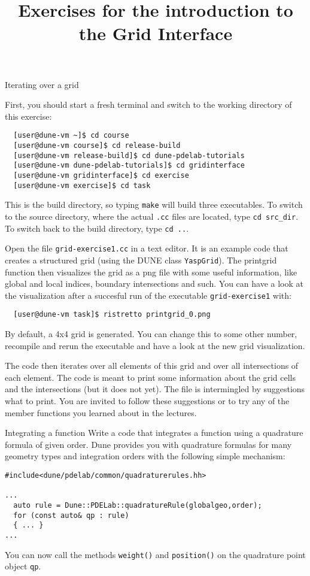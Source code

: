 \documentclass[12pt,a4paper]{article}
\title{\textbf{Exercises for the introduction to the Grid Interface}}
\begin{document}
\exerciseheader

\begin{Exercise}{Iterating over a grid}

First, you should start a fresh terminal and switch to the working directory of this exercise:
\begin{lstlisting}
  [user@dune-vm ~]$ cd course
  [user@dune-vm course]$ cd release-build
  [user@dune-vm release-build]$ cd dune-pdelab-tutorials
  [user@dune-vm dune-pdelab-tutorials]$ cd gridinterface
  [user@dune-vm gridinterface]$ cd exercise
  [user@dune-vm exercise]$ cd task
\end{lstlisting}

This is the build directory, so typing \lstinline!make! will build three executables.
To switch to the source directory, where the actual \lstinline!.cc! files are located, type \lstinline!cd src_dir!.
To switch back to the build directory, type \lstinline!cd ..!.

Open the file \texttt{grid-exercise1.cc} in a text editor.  It is an
example code that creates a structured grid (using the DUNE class
\texttt{YaspGrid}). The printgrid function then visualizes the grid
as a png file with some useful information, like global and local
indices, boundary intersections and such. You can have a look at the
visualization after a succesful run of the executable \lstinline!grid-exercise1!
with:

\begin{lstlisting}
  [user@dune-vm task]$ ristretto printgrid_0.png
\end{lstlisting}

By default, a 4x4 grid is generated. You can change this to some
other number, recompile and rerun the executable and have a look at
the new grid visualization.

The code then iterates over all elements of this grid and
over all intersections of each element.  The code is meant to print
some information about the grid cells and the intersections (but it
does not yet).  The file is intermingled by suggestions what to print.
You are invited to follow these suggestions or to try any of the
member functions you learned about in the lectures.
\end{Exercise}

\begin{Exercise}{Integrating a function}
 Write a code that integrates a function using a quadrature formula of given order.
 Dune provides you with quadrature formulas for many geometry types and integration orders
 with the following simple mechanism:

\begin{lstlisting}
#include<dune/pdelab/common/quadraturerules.hh>

...
  auto rule = Dune::PDELab::quadratureRule(globalgeo,order);
  for (const auto& qp : rule)
  { ... }
...
\end{lstlisting}
 You can now call the methods \verb!weight()! and \verb!position()! on the quadrature
 point object \verb!qp!.
\end{Exercise}
\end{document}
